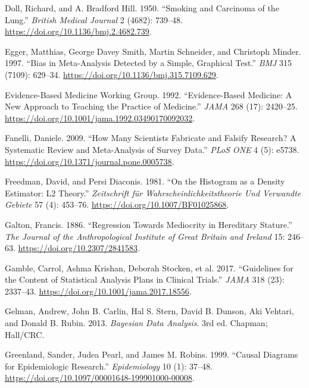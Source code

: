 \documentclass[
]{book}
\newlength{\cslhangindent}
\newenvironment{CSLReferences}[2] %
 {\begin{list}{}{%
  \setlength{\itemindent}{0pt}
  \setlength{\leftmargin}{0pt}
  \setlength{\parsep}{0pt}
  \ifodd #1
   \setlength{\leftmargin}{\cslhangindent}
   \setlength{\itemindent}{-1\cslhangindent}
  \fi
  \setlength{\itemsep}{#2\baselineskip}}}
 {\end{list}}
\begin{document}
\begin{CSLReferences}{1}{1}
Doll, Richard, and A. Bradford Hill. 1950. {``Smoking and Carcinoma of the Lung.''} \emph{British Medical Journal} 2 (4682): 739--48. \url{https://doi.org/10.1136/bmj.2.4682.739}.

Egger, Matthias, George Davey Smith, Martin Schneider, and Christoph Minder. 1997. {``Bias in Meta-Analysis Detected by a Simple, Graphical Test.''} \emph{BMJ} 315 (7109): 629--34. \url{https://doi.org/10.1136/bmj.315.7109.629}.

Evidence-Based Medicine Working Group. 1992. {``Evidence-Based Medicine: A New Approach to Teaching the Practice of Medicine.''} \emph{JAMA} 268 (17): 2420--25. \url{https://doi.org/10.1001/jama.1992.03490170092032}.

Fanelli, Daniele. 2009. {``How Many Scientists Fabricate and Falsify Research? {A} Systematic Review and Meta-Analysis of Survey Data.''} \emph{PLoS ONE} 4 (5): e5738. \url{https://doi.org/10.1371/journal.pone.0005738}.

Freedman, David, and Persi Diaconis. 1981. {``On the Histogram as a Density Estimator: {L2} Theory.''} \emph{Zeitschrift f{ü}r Wahrscheinlichkeitstheorie Und Verwandte Gebiete} 57 (4): 453--76. \url{https://doi.org/10.1007/BF01025868}.

Galton, Francis. 1886. {``Regression Towards Mediocrity in Hereditary Stature.''} \emph{The Journal of the Anthropological Institute of Great Britain and Ireland} 15: 246--63. \url{https://doi.org/10.2307/2841583}.

{Gamble, Carrol, Ashma Krishan, Deborah Stocken, et al.} 2017. {``Guidelines for the Content of Statistical Analysis Plans in Clinical Trials.''} \emph{JAMA} 318 (23): 2337--43. \url{https://doi.org/10.1001/jama.2017.18556}.

Gelman, Andrew, John B. Carlin, Hal S. Stern, David B. Dunson, Aki Vehtari, and Donald B. Rubin. 2013. \emph{Bayesian Data Analysis}. 3rd ed. Chapman; Hall/CRC.

Greenland, Sander, Judea Pearl, and James M. Robins. 1999. {``Causal Diagrams for Epidemiologic Research.''} \emph{Epidemiology} 10 (1): 37--48. \url{https://doi.org/10.1097/00001648-199901000-00008}.


\end{CSLReferences}
\end{document}
